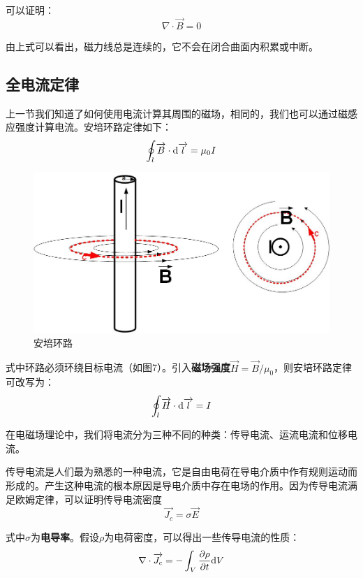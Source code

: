 \documentclass[UTF8,a4paper,11pt]{article}
\begin{document}
可以证明：
\begin{equation}
\nabla\cdot\overrightarrow{B}=0
\end{equation}

由上式可以看出，磁力线总是连续的，它不会在闭合曲面内积累或中断。

\subsection{全电流定律}
上一节我们知道了如何使用电流计算其周围的磁场，相同的，我们也可以通过磁感应强度计算电流。安培环路定律如下：
\begin{equation}
\oint_l\overrightarrow{B}\cdot{\rm d}\overrightarrow{l}=\mu_0I
\end{equation}

\begin{figure}[htbp]
\centering
\includegraphics[scale=0.3]{p7.jpg}
\caption{安培环路}
\end{figure}
式中环路必须环绕目标电流（如图7）。引入\textbf{磁场强度}$\overrightarrow{H}=\overrightarrow{B}/\mu_0$，则安培环路定律可改写为：
\begin{equation}
\oint_l\overrightarrow{H}\cdot{\rm d}\overrightarrow{l}=I
\end{equation}

在电磁场理论中，我们将电流分为三种不同的种类：传导电流、运流电流和位移电流。

传导电流是人们最为熟悉的一种电流，它是自由电荷在导电介质中作有规则运动而形成的。产生这种电流的根本原因是导电介质中存在电场的作用。因为传导电流满足欧姆定律，可以证明传导电流密度
\begin{equation}
\overrightarrow{J_c}=\sigma\overrightarrow{E}
\end{equation}

式中$\sigma$为\textbf{电导率}。假设$\rho$为电荷密度，可以得出一些传导电流的性质：
\begin{equation}
\nabla\cdot\overrightarrow{J_c}=-\int_V\frac{\partial\rho}{\partial t}{\rm d}V
\end{equation}
\end{document}
